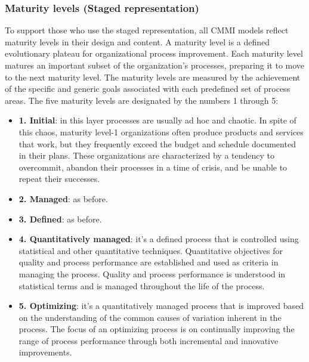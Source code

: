 \subsubsection{Maturity levels (Staged representation)}
To support those who use the staged representation, all CMMI models reflect maturity levels in their design and content.
A maturity level is a defined evolutionary plateau for organizational process improvement.
Each maturity level matures an important subset of the organization's processes, preparing it to move to the next maturity level.
The maturity levels are measured by the achievement of the specific and generic goals associated with each predefined set of process areas.
The five maturity levels are designated by the numbers 1 through 5:
\begin{itemize}
      \item \textbf{1. Initial}: in this layer processes are usually ad hoc and chaotic. In spite of this chaos, maturity level-1 organizations often produce products and services that work, but they frequently exceed the budget and schedule documented in their plans.
            These organizations are characterized by a tendency to overcommit, abandon their processes in a time of crisis, and be unable to repeat their successes.
      \item \textbf{2. Managed}: as before.
      \item \textbf{3. Defined}: as before.
      \item \textbf{4. Quantitatively managed}: it's a defined process that is controlled using statistical and other quantitative techniques.
            Quantitative objectives for quality and process performance are established and used as criteria in managing the process.
            Quality and process performance is understood in statistical terms and is managed throughout the life of the process.
      \item \textbf{5. Optimizing}: it's a quantitatively managed process that is improved based on the understanding of the common causes of variation inherent in the process.
            The focus of an optimizing process is on continually improving the range of process performance through both incremental and innovative improvements.
\end{itemize}


